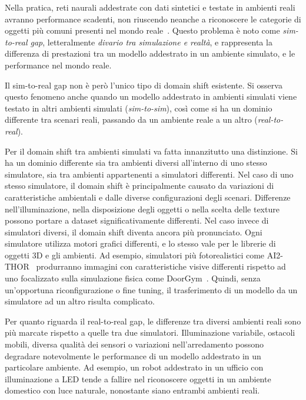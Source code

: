 \documentclass[12pt]{report}
\begin{document}
Nella pratica, reti naurali addestrate con dati sintetici e testate in ambienti reali avranno performance scadenti, non riuscendo neanche a riconoscere le categorie di oggetti più comuni presenti nel mondo reale~\cite{8793591}. Questo problema è noto come \textit{sim-to-real gap}, letteralmente \textit{divario tra simulazione e realtà}, e rappresenta la differenza di prestazioni tra un modello addestrato in un ambiente simulato, e le performance nel mondo reale.

Il sim-to-real gap non è però l'unico tipo di domain shift esistente. Si osserva questo fenomeno anche quando un modello addestrato in ambienti simulati viene testato in altri ambienti simulati (\textit{sim-to-sim}), così come si ha un dominio differente tra scenari reali, passando da un ambiente reale a un altro (\textit{real-to-real}).

Per il domain shift tra ambienti simulati va fatta innanzitutto una distinzione. Si ha un dominio differente sia tra ambienti diversi all'interno di uno stesso simulatore, sia tra ambienti appartenenti a simulatori differenti. Nel caso di uno stesso simulatore, il domain shift è principalmente causato da variazioni di caratteristiche ambientali e dalle diverse configurazioni degli scenari. Differenze nell'illuminazione, nella disposizione degli oggetti o nella scelta delle texture possono portare a dataset significativamente differenti. Nel caso invece di simulatori diversi, il domain shift diventa ancora più pronunciato. Ogni simulatore utilizza motori grafici differenti, e lo stesso vale per le librerie di oggetti 3D e gli ambienti. Ad esempio, simulatori più fotorealistici come AI2-THOR~\cite{kolve2022ai2thorinteractive3denvironment} produrranno immagini con caratteristiche visive differenti rispetto ad uno focalizzato sulla simulazione fisica come DoorGym~\cite{urakami2022doorgymscalabledooropening}. Quindi, senza un'opportuna riconfigurazione o fine tuning, il trasferimento di un modello da un simulatore ad un altro risulta complicato.

Per quanto riguarda il real-to-real gap, le differenze tra diversi ambienti reali sono più marcate rispetto a quelle tra due simulatori. Illuminazione variabile, ostacoli mobili, diversa qualità dei sensori o variazioni nell'arredamento possono degradare notevolmente le performance di un modello addestrato in un particolare ambiente. Ad esempio, un robot addestrato in un ufficio con illuminazione a LED tende a fallire nel riconoscere oggetti in un ambiente domestico con luce naturale, nonostante siano entrambi ambienti reali.
\end{document}
